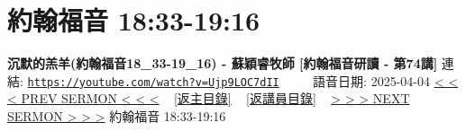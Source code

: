\documentclass{book}
\begin{document}
\section{約翰福音 18:33-19:16}
\label{sec:Ujp9LOC7dII}
\textbf{沉默的羔羊(約翰福音18\_33-19\_16) - 蘇穎睿牧師 [約翰福音研讀 - 第74講]}
\newline
\newline
連結: \href{https://youtube.com/watch?v=Ujp9LOC7dII}{\texttt{https://youtube.com/watch?v=Ujp9LOC7dII}} ~~~~ 語音日期: 2025-04-04
\newline
\newline
\hyperref[sec:8Xvna8FV9_s]{< < < PREV SERMON < < <}
~
\hyperlink{toc}{[返主目錄]}
~
\hyperref[ch:preacher11]{[返講員目錄]}
~
\hyperref[sec:tSKgQzYFv8g]{> > > NEXT SERMON > > >}
\newline
\newline
約翰福音 18:33-19:16
\newline
\end{document}
